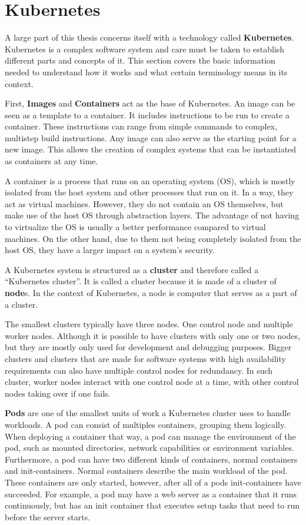\section{Kubernetes}\label{sec:kubernetes}

A large part of this thesis concerns itself with a technology called \textbf{Kubernetes}.
Kubernetes is a complex software system and care must be taken to establish different parts and concepts of it.
This section covers the basic information needed to understand how it works and what certain terminology means in its context.

First, \textbf{Images} and \textbf{Containers}\cite{docker-image} act as the base of Kubernetes.
An image can be seen as a template to a container.
It includes instructions to be run to create a container.
These instructions can range from simple commands to complex, multistep build instructions.
Any image can also serve as the starting point for a new image.
This allows the creation of complex systems that can be instantiated as containers at any time.

A container\cite{what-are-linux-containers} is a process that runs on an operating system (OS), which is mostly isolated from the host system and other processes that run on it.
In a way, they act as virtual machines.
However, they do not contain an OS themselves, but make use of the host OS through abstraction layers.
The advantage of not having to virtualize the OS is usually a better performance compared to virtual machines.
On the other hand, due to them not being completely isolated from the host OS, they have a larger impact on a system's security.

A Kubernetes system is structured as a \textbf{cluster} and therefore called a ``Kubernetes cluster''.
It is called a cluster because it is made of a cluster of \textbf{node}s.
In the context of Kubernetes, a node is computer that serves as a part of a cluster.

The smallest clusters typically have three nodes.
One control node and multiple worker nodes.
Although it is possible to have clusters with only one or two nodes, but they are mostly only used for development and debugging purposes.
Bigger clusters and clusters that are made for software systems with high availability requirements can also have multiple control nodes for redundancy.
In such cluster, worker nodes interact with one control node at a time, with other control nodes taking over if one fails.

\textbf{Pods} are one of the smallest units of work a Kubernetes cluster uses to handle workloads.
A pod can consist of multiples containers, grouping them logically.
When deploying a container that way, a pod can manage the environment of the pod, such as mounted directories, network capabilities or environment variables.
Furthermore, a pod can have two different kinds of containers, normal containers and init-containers.
Normal containers describe the main workload of the pod.
These containers are only started, however, after all of a pods init-containers have succeeded.
For example, a pod may have a web server as a container that it runs continuously, but has an init container that executes setup tasks that need to run before the server starts.


